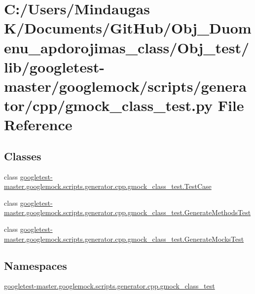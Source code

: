 \hypertarget{_obj__test_2lib_2googletest-master_2googlemock_2scripts_2generator_2cpp_2gmock__class__test_8py}{}\section{C\+:/\+Users/\+Mindaugas K/\+Documents/\+Git\+Hub/\+Obj\+\_\+\+Duomenu\+\_\+apdorojimas\+\_\+class/\+Obj\+\_\+test/lib/googletest-\/master/googlemock/scripts/generator/cpp/gmock\+\_\+class\+\_\+test.py File Reference}
\label{_obj__test_2lib_2googletest-master_2googlemock_2scripts_2generator_2cpp_2gmock__class__test_8py}
\subsection*{Classes}
\begin{DoxyCompactItemize}
\item 
class \mbox{\hyperlink{classgoogletest-master_1_1googlemock_1_1scripts_1_1generator_1_1cpp_1_1gmock__class__test_1_1_test_case}{googletest-\/master.\+googlemock.\+scripts.\+generator.\+cpp.\+gmock\+\_\+class\+\_\+test.\+Test\+Case}}
\item 
class \mbox{\hyperlink{classgoogletest-master_1_1googlemock_1_1scripts_1_1generator_1_1cpp_1_1gmock__class__test_1_1_generate_methods_test}{googletest-\/master.\+googlemock.\+scripts.\+generator.\+cpp.\+gmock\+\_\+class\+\_\+test.\+Generate\+Methods\+Test}}
\item 
class \mbox{\hyperlink{classgoogletest-master_1_1googlemock_1_1scripts_1_1generator_1_1cpp_1_1gmock__class__test_1_1_generate_mocks_test}{googletest-\/master.\+googlemock.\+scripts.\+generator.\+cpp.\+gmock\+\_\+class\+\_\+test.\+Generate\+Mocks\+Test}}
\end{DoxyCompactItemize}
\subsection*{Namespaces}
\begin{DoxyCompactItemize}
\item 
 \mbox{\hyperlink{namespacegoogletest-master_1_1googlemock_1_1scripts_1_1generator_1_1cpp_1_1gmock__class__test}{googletest-\/master.\+googlemock.\+scripts.\+generator.\+cpp.\+gmock\+\_\+class\+\_\+test}}
\end{DoxyCompactItemize}
